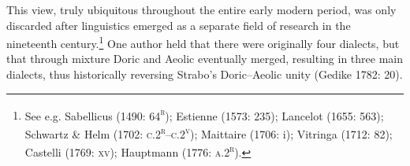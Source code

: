 \documentclass[12pt]{article}
\newenvironment{styleStandard}{\renewcommand\baselinestretch{1.25}\setlength\leftskip{0in}\setlength\rightskip{0in}\setlength\parindent{0.1972in}\setlength\parfillskip{0pt plus 1fil}\setlength\parskip{0in plus 1pt}\writerlistparindent\writerlistleftskip\leavevmode\normalfont\normalsize\writerlistlabel\ignorespaces}{\unskip\vspace{0in plus 1pt}\par}
\newcommand\writerlistleftskip{}
\newcommand\writerlistparindent{}
\newcommand\writerlistlabel{}
\begin{document}
\begin{styleStandard}
This view, truly ubiquitous throughout the entire early modern period, was only discarded after linguistics emerged as a separate field of research in the nineteenth century.\footnote{ See e.g. Sabellicus (1490: 64\textsc{\textsuperscript{r}}); Estienne (1573: 235); Lancelot (1655: 563); Schwartz \& Helm (1702: \textsc{c.2}\textsc{\textsuperscript{r}}–\textsc{c.2}\textsc{\textsuperscript{v}}); Maittaire (1706: i); Vitringa (1712: 82); Castelli (1769: \textsc{xv}); Hauptmann (1776: \textsc{a.2}\textsc{\textsuperscript{r}}).} One author held that there were originally four dialects, but that through mixture Doric and Aeolic eventually merged, resulting in three main dialects, thus historically reversing Strabo’s Doric–Aeolic unity (Gedike 1782: 20).
\end{styleStandard}
\end{document}
